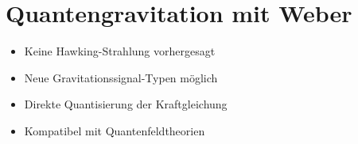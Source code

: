 \section{Quantengravitation mit Weber}
\begin{itemize}
\item Keine Hawking-Strahlung vorhergesagt
\item Neue Gravitationssignal-Typen möglich
\item Direkte Quantisierung der Kraftgleichung
\item Kompatibel mit Quantenfeldtheorien
\end{itemize}